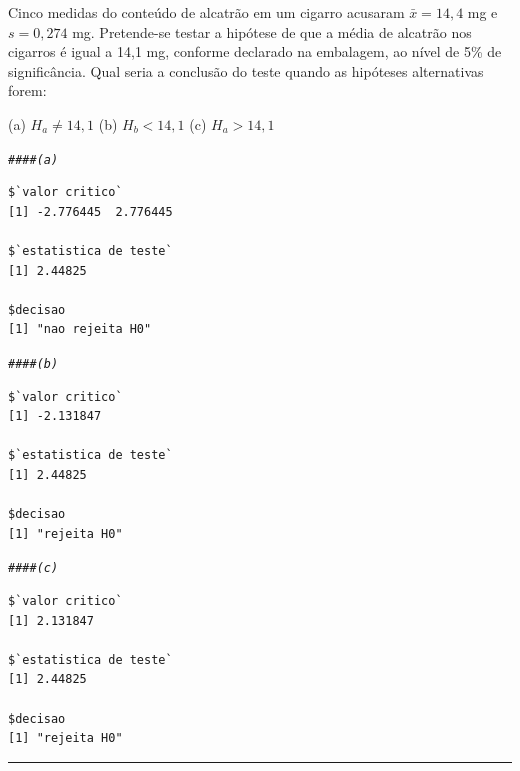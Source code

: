 \documentclass[a4paper,11pt,fleqn]{article}\usepackage[]{graphicx}\usepackage[]{color}
\makeatletter
\newcommand{\hlcom}[1]{\textcolor[rgb]{0.4,0.4,0.4}{\textit{#1}}}%
\newenvironment{kframe}{%
 \def\at@end@of@kframe{}%
 \ifinner\ifhmode%
  \def\at@end@of@kframe{\end{minipage}}%
  \begin{minipage}{\columnwidth}%
 \fi\fi%
 \def\FrameCommand##1{\hskip\@totalleftmargin \hskip-\fboxsep
 \colorbox{shadecolor}{##1}\hskip-\fboxsep
     \hskip-\linewidth \hskip-\@totalleftmargin \hskip\columnwidth}%
 \MakeFramed {\advance\hsize-\width
   \@totalleftmargin\z@ \linewidth\hsize
   \@setminipage}}%
 {\par\unskip\endMakeFramed%
 \at@end@of@kframe}
\newenvironment{knitrout}{}{} %
\theoremstyle{definition}
\makeatother
\begin{document}
\begin{compactenum}[18.] %
\item Cinco medidas do conteúdo de alcatrão em um cigarro acusaram
  $\bar{x} = 14,4$ mg e $s = 0,274$ mg. Pretende-se testar a hipótese de
  que a média de alcatrão nos cigarros é igual a 14,1 mg, conforme
  declarado na embalagem, ao nível de 5\% de significância. Qual seria a
  conclusão do teste quando as hipóteses alternativas forem:
  \begin{compactenum}
  \item[] (a) $H_a \neq 14,1$ \qquad (b) $H_b < 14,1$ \qquad (c) $H_a > 14,1$
  \end{compactenum}
\begin{knitrout}\small
{}\color{fgcolor}\begin{kframe}
\begin{alltt}
\hlcom{#### (a)}
\end{alltt}
\begin{verbatim}
$`valor critico`
[1] -2.776445  2.776445

$`estatistica de teste`
[1] 2.44825

$decisao
[1] "nao rejeita H0"
\end{verbatim}
\begin{alltt}
\hlcom{#### (b)}
\end{alltt}
\begin{verbatim}
$`valor critico`
[1] -2.131847

$`estatistica de teste`
[1] 2.44825

$decisao
[1] "rejeita H0"
\end{verbatim}
\begin{alltt}
\hlcom{#### (c)}
\end{alltt}
\begin{verbatim}
$`valor critico`
[1] 2.131847

$`estatistica de teste`
[1] 2.44825

$decisao
[1] "rejeita H0"
\end{verbatim}
\end{kframe}
\end{knitrout}
\end{compactenum}

\vspace{0.3cm}
\hrule
\vspace{0.3cm}
\end{document}
